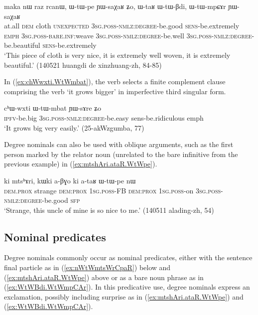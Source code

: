 \begin{exe}
\ex \label{ex:WtaR.WtWBdi}
\gll maka nɯ raz rcanɯ, ɯ-tɯ-pe ɲɯ-saχaʁ ʑo, ɯ-taʁ ɯ-tɯ-βdi, ɯ-tɯ-mpɕɤr ɲɯ-saχaʁ \\
at.all \textsc{dem} cloth \textsc{unexpected}  \textsc{3sg}.\textsc{poss}-\textsc{nmlz}:\textsc{degree}-be.good \textsc{sens}-be.extremely \textsc{emph} \textsc{3sg}.\textsc{poss}-\textsc{bare}.\textsc{inf}:weave  \textsc{3sg}.\textsc{poss}-\textsc{nmlz}:\textsc{degree}-be.well \textsc{3sg}.\textsc{poss}-\textsc{nmlz}:\textsc{degree}-be.beautiful \textsc{sens}-be.extremely \\
\glt `This piece of cloth is very nice, it is extremely well woven, it is extremely beautiful.' (140521 huangdi de xinzhuang-zh, 84-85)
\end{exe}

In (\ref{ex:chWwxti.WtWmbat}), the verb  selects a finite complement clause comprising the verb  `it grows bigger' in imperfective third singular form.

\begin{exe}
\ex \label{ex:chWwxti.WtWmbat}
\gll cʰɯ-wxti ɯ-tɯ-mbat ɲɯ-sɤre ʑo \\
\textsc{ipfv}-be.big  \textsc{3sg}.\textsc{poss}-\textsc{nmlz}:\textsc{degree}-be.easy sens-be.ridiculous emph \\ 
\glt `It grows big very easily.' (25-akWzgumba, 77)
\end{exe}

Degree nominals can also be used with oblique arguments, such as the first person marked by the relator noun  (unrelated to the bare infinitive  from the previous example) in (\ref{ex:mtshAri.ataR.WtWpe}).

\begin{exe}
\ex \label{ex:mtshAri.ataR.WtWpe}
\gll ki mtsʰɤri, kɯki a-βɣo ki a-taʁ ɯ-tɯ-pe nɯ \\
\textsc{dem}.\textsc{prox} strange \textsc{dem}:\textsc{prox} \textsc{1sg}.\textsc{poss}-FB \textsc{dem}:\textsc{prox} \textsc{1sg}.\textsc{poss}-on \textsc{3sg}.\textsc{poss}-\textsc{nmlz}:\textsc{degree}-be.good \textsc{sfp} \\
\glt `Strange, this uncle of mine is so nice to me.' (140511 alading-zh, 54)
\end{exe}

\subsection{Nominal predicates} \label{sec:degree.nominal.predicates}
Degree nominals commonly occur as nominal predicates, either with the sentence final particle  as in (\ref{ex:nWtWmtsWrCpaR}) below and (\ref{ex:mtshAri.ataR.WtWpe}) above or as a bare noun phrase as in (\ref{ex:WtWBdi.WtWmpCAr}). In this predicative use, degree nominals express an exclamation, possibly including surprise as in (\ref{ex:mtshAri.ataR.WtWpe}) and (\ref{ex:WtWBdi.WtWmpCAr}).

